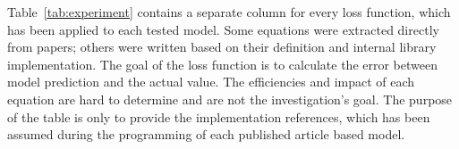 \mbox{Table~\ref{tab:experiment}} contains a separate column for every loss function, which has been applied to each tested model.
Some equations were extracted directly from papers; others were written based on their definition and internal library implementation.
The goal of the loss function is to calculate the error between model prediction and the actual value.
The efficiencies and impact of each equation are hard to determine and are not the investigation's goal.
The purpose of the table is only to provide the implementation references, which has been assumed during the programming of each published article based model.



